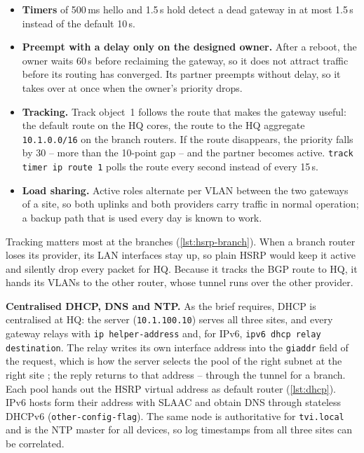 \begin{itemize}
  \item \textbf{Timers} of 500\,ms hello and 1.5\,s hold detect a dead gateway in at most 1.5\,s instead of
        the default 10\,s.
  \item \textbf{Preempt with a delay only on the designed owner.} After a reboot, the owner waits 60\,s
        before reclaiming the gateway, so it does not attract traffic before its routing has converged.
        Its partner preempts without delay, so it takes over at once when the owner's priority drops.
  \item \textbf{Tracking.} Track object~1 follows the route that makes the gateway useful: the default route
        on the HQ cores, the route to the HQ aggregate \texttt{10.1.0.0/16} on the branch routers. If the
        route disappears, the priority falls by 30 -- more than the 10-point gap -- and the partner becomes
        active. \texttt{track timer ip route 1} polls the route every second instead of every 15\,s.
  \item \textbf{Load sharing.} Active roles alternate per VLAN between the two gateways of a site, so both
        uplinks and both providers carry traffic in normal operation; a backup path that is used every day
        is known to work.
\end{itemize}

Tracking matters most at the branches (\cref{lst:hsrp-branch}). When a branch router loses its provider, its
LAN interfaces stay up, so plain HSRP would keep it active and silently drop every packet for HQ. Because it
tracks the BGP route to HQ, it hands its VLANs to the other router, whose tunnel runs over the other
provider.


\textbf{Centralised DHCP, DNS and NTP.} As the brief requires, DHCP is centralised at HQ: the server
 (\texttt{10.1.100.10}) serves all three sites, and every gateway relays with \texttt{ip helper-address} and, for IPv6,
\texttt{ipv6 dhcp relay destination}. The relay writes its own interface address into the
\texttt{giaddr} field of the request, which is how the server selects the pool of the right subnet at the
right site \cite{rfc2131}; the reply returns to that address -- through the tunnel for a branch. Each pool
hands out the HSRP virtual address as default router (\cref{lst:dhcp}). IPv6 hosts form their address with
SLAAC and obtain DNS through stateless DHCPv6 (\texttt{other-config-flag}). The same node is authoritative
for \texttt{tvi.local} and is the NTP master for all devices, so log timestamps from all three sites can be
correlated.

